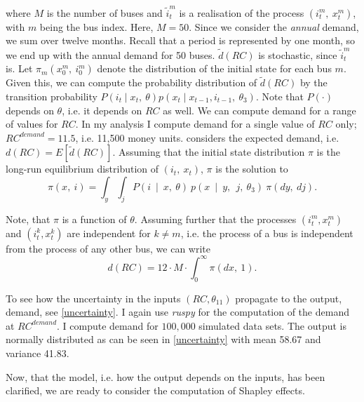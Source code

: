 \noindent where $M$ is the number of buses and ${\tilde{i}}_t^m$ is a realisation of the process $(i_t^m,\ x_t^m)$, with $m$ being the bus index. Here, $M=50$. Since we consider the \textit{annual} demand, we sum over twelve months. Recall that a period is represented by one month, so we end up with the annual demand for 50 buses. $\tilde{d}(RC)$ is stochastic, since ${\tilde{i}}_t^m$ is. Let $\pi_m(x_0^m,\ i_0^m)$ denote the distribution of the initial state for each bus $m$. Given this, we can compute the probability distribution of $\tilde{d}(RC) $ by the transition probability $P(i_t \mid x_t,\ \theta)p(x_t \mid x_{t-1}, i_{t-1},\ \theta_3) $. Note that $P(\cdot)$ depends on $\theta$, i.e. it depends on $RC$ as well. We can compute demand for a range of values for $RC$. In my analysis I compute demand for a single value of $RC$ only; $RC^{demand}=11.5$, i.e. 11,500 money units. \citet{R87} considers the expected demand, i.e. $d(RC)=E[\tilde{d}(RC)]$. Assuming that the initial state distribution $\pi$ is the long-run equilibrium distribution of $(i_t,\ x_t)$, $\pi$ is the solution to
\begin{equation}
\pi(x,\ i)=\int_y \int_j P(i\ \mid\ x,\ \theta)\ p(x\ \mid\ y,\ \ j,\ \theta_3)\ \pi(dy,\ dj).
\end{equation}

Note, that $\pi$ is a function of $\theta$. Assuming further that the processes $ (i_t^m, x_t^m)$ and $(i_t^k, x_t^k)$ are independent for $k \neq m$, i.e. the process of a bus is independent from the process of any other bus, we can write
\begin{equation}
d(RC)=12 \cdot M \cdot \int_0^{\infty} \pi(dx,\ 1).
\end{equation}

To see how the uncertainty in the inputs $(RC, \theta_{11})$ propagate to the output, demand, see \cref{uncertainty}. I again use \textit{ruspy} for the computation of the demand at $RC^{demand}$. I compute demand for $100,000$ simulated data sets. The output is normally distributed as can be seen in \cref{uncertainty} with mean 58.67 and variance 41.83.

Now, that the model, i.e. how the output depends on the inputs, has been clarified, we are ready to consider the computation of Shapley effects.

